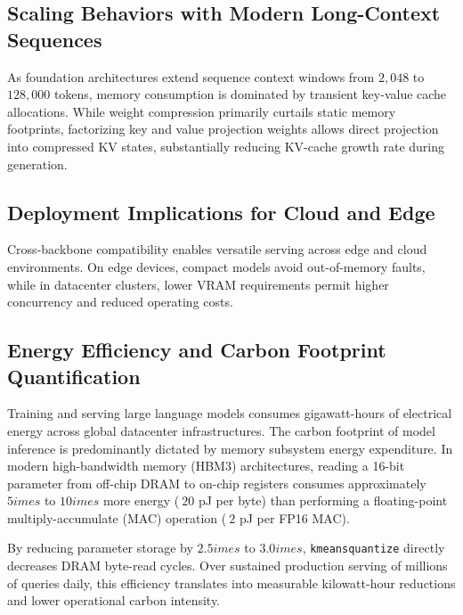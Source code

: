 \subsection{Scaling Behaviors with Modern Long-Context Sequences}
As foundation architectures extend sequence context windows from $2{,}048$ to $128{,}000$ tokens, memory consumption is dominated by transient key-value cache allocations. While weight compression primarily curtails static memory footprints, factorizing key and value projection weights allows direct projection into compressed KV states, substantially reducing KV-cache growth rate during generation.

\subsection{Deployment Implications for Cloud and Edge}
Cross-backbone compatibility enables versatile serving across edge and cloud environments. On edge devices, compact models avoid out-of-memory faults, while in datacenter clusters, lower VRAM requirements permit higher concurrency and reduced operating costs.

\subsection{Energy Efficiency and Carbon Footprint Quantification}
Training and serving large language models consumes gigawatt-hours of electrical energy across global datacenter infrastructures. The carbon footprint of model inference is predominantly dictated by memory subsystem energy expenditure. In modern high-bandwidth memory (HBM3) architectures, reading a 16-bit parameter from off-chip DRAM to on-chip registers consumes approximately $5	imes$ to $10	imes$ more energy ($~20$ pJ per byte) than performing a floating-point multiply-accumulate (MAC) operation ($~2$ pJ per FP16 MAC).

By reducing parameter storage by $2.5	imes$ to $3.0	imes$, \texttt{kmeansquantize} directly decreases DRAM byte-read cycles. Over sustained production serving of millions of queries daily, this efficiency translates into measurable kilowatt-hour reductions and lower operational carbon intensity.
